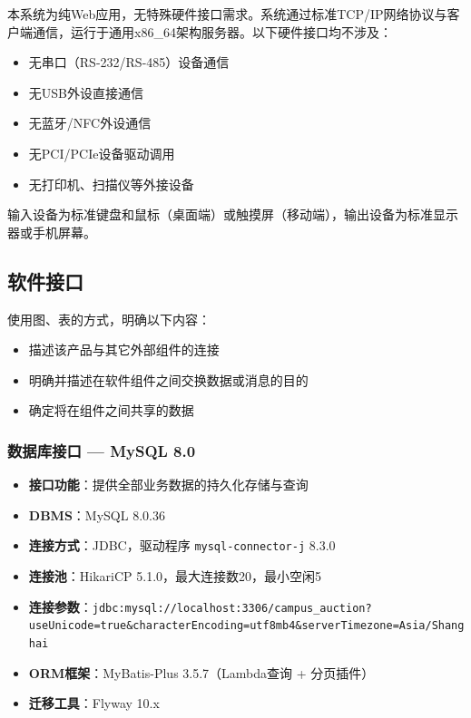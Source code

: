 \documentclass[12pt,a4paper]{ctexart}
\numberwithin{figure}{section}
\numberwithin{table}{section}
\begin{document}
本系统为纯Web应用，无特殊硬件接口需求。系统通过标准TCP/IP网络协议与客户端通信，运行于通用x86\_64架构服务器。以下硬件接口均不涉及：

\begin{itemize}
    \item 无串口（RS-232/RS-485）设备通信
    \item 无USB外设直接通信
    \item 无蓝牙/NFC外设通信
    \item 无PCI/PCIe设备驱动调用
    \item 无打印机、扫描仪等外接设备
\end{itemize}

输入设备为标准键盘和鼠标（桌面端）或触摸屏（移动端），输出设备为标准显示器或手机屏幕。

\subsection{软件接口}

使用图、表的方式，明确以下内容：

\begin{itemize}
    \item 描述该产品与其它外部组件的连接
    \item 明确并描述在软件组件之间交换数据或消息的目的
    \item 确定将在组件之间共享的数据
\end{itemize}

\subsubsection{数据库接口 --- MySQL 8.0}

\begin{itemize}
    \item \textbf{接口功能}：提供全部业务数据的持久化存储与查询
    \item \textbf{DBMS}：MySQL 8.0.36
    \item \textbf{连接方式}：JDBC，驱动程序 \verb|mysql-connector-j| 8.3.0
    \item \textbf{连接池}：HikariCP 5.1.0，最大连接数20，最小空闲5
    \item \textbf{连接参数}：\verb|jdbc:mysql://localhost:3306/campus_auction?useUnicode=true&characterEncoding=utf8mb4&serverTimezone=Asia/Shanghai|
    \item \textbf{ORM框架}：MyBatis-Plus 3.5.7（Lambda查询 + 分页插件）
    \item \textbf{迁移工具}：Flyway 10.x
\end{itemize}
\end{document}
